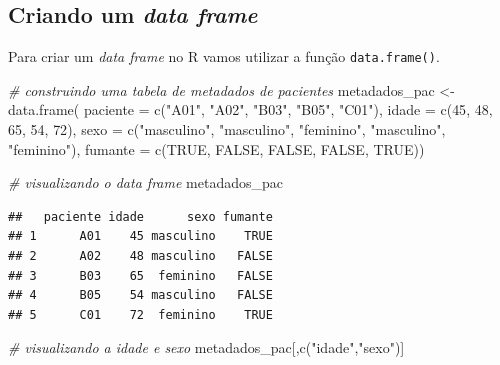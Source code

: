 \documentclass[
]{book}
\newenvironment{Shaded}{\begin{snugshade}}{\end{snugshade}}
\newcommand{\AttributeTok}[1]{\textcolor[rgb]{0.77,0.63,0.00}{#1}}
\newcommand{\CommentTok}[1]{\textcolor[rgb]{0.56,0.35,0.01}{\textit{#1}}}
\newcommand{\ConstantTok}[1]{\textcolor[rgb]{0.00,0.00,0.00}{#1}}
\newcommand{\DecValTok}[1]{\textcolor[rgb]{0.00,0.00,0.81}{#1}}
\newcommand{\FunctionTok}[1]{\textcolor[rgb]{0.00,0.00,0.00}{#1}}
\newcommand{\NormalTok}[1]{#1}
\newcommand{\OtherTok}[1]{\textcolor[rgb]{0.56,0.35,0.01}{#1}}
\newcommand{\StringTok}[1]{\textcolor[rgb]{0.31,0.60,0.02}{#1}}
\begin{document}
\hypertarget{criando-um-data-frame}{%
\subsection{\texorpdfstring{Criando um \emph{data frame}}{Criando um data frame}}\label{criando-um-data-frame}}

Para criar um \emph{data frame} no R vamos utilizar a função \texttt{data.frame()}.

\begin{Shaded}
\begin{Highlighting}[]
\CommentTok{\# construindo uma tabela de metadados de pacientes}
\NormalTok{metadados\_pac }\OtherTok{\textless{}{-}} \FunctionTok{data.frame}\NormalTok{(}
  \AttributeTok{paciente =} \FunctionTok{c}\NormalTok{(}\StringTok{"A01"}\NormalTok{, }\StringTok{"A02"}\NormalTok{, }\StringTok{"B03"}\NormalTok{, }\StringTok{"B05"}\NormalTok{, }\StringTok{"C01"}\NormalTok{),}
  \AttributeTok{idade =} \FunctionTok{c}\NormalTok{(}\DecValTok{45}\NormalTok{, }\DecValTok{48}\NormalTok{, }\DecValTok{65}\NormalTok{, }\DecValTok{54}\NormalTok{, }\DecValTok{72}\NormalTok{),}
  \AttributeTok{sexo =} \FunctionTok{c}\NormalTok{(}\StringTok{"masculino"}\NormalTok{, }\StringTok{"masculino"}\NormalTok{, }\StringTok{"feminino"}\NormalTok{, }\StringTok{"masculino"}\NormalTok{, }\StringTok{"feminino"}\NormalTok{),}
  \AttributeTok{fumante =} \FunctionTok{c}\NormalTok{(}\ConstantTok{TRUE}\NormalTok{, }\ConstantTok{FALSE}\NormalTok{, }\ConstantTok{FALSE}\NormalTok{, }\ConstantTok{FALSE}\NormalTok{, }\ConstantTok{TRUE}\NormalTok{))}

\CommentTok{\# visualizando o data frame}
\NormalTok{metadados\_pac}
\end{Highlighting}
\end{Shaded}

\begin{verbatim}
##   paciente idade      sexo fumante
## 1      A01    45 masculino    TRUE
## 2      A02    48 masculino   FALSE
## 3      B03    65  feminino   FALSE
## 4      B05    54 masculino   FALSE
## 5      C01    72  feminino    TRUE
\end{verbatim}

\begin{Shaded}
\begin{Highlighting}[]
\CommentTok{\# visualizando a idade e sexo}
\NormalTok{metadados\_pac[,}\FunctionTok{c}\NormalTok{(}\StringTok{"idade"}\NormalTok{,}\StringTok{"sexo"}\NormalTok{)]}
\end{Highlighting}
\end{Shaded}
\end{document}
